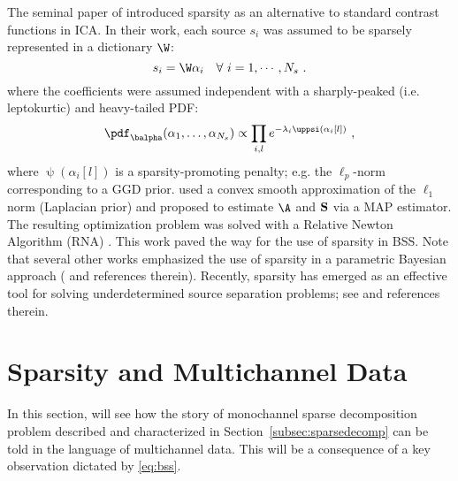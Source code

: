 The seminal paper of \citet{ica:zibu_pearl} introduced sparsity as an alternative to standard contrast functions in ICA. 
In their work, each source $s_i$ was assumed to be sparsely represented in a dictionary $\W$:
\begin{equation}
s_i =  \W \alpha_i \quad \forall ~ i=1,\cdots,N_s ~.
\end{equation}
where the coefficients were assumed independent with a sharply-peaked (i.e. leptokurtic) and heavy-tailed PDF:
\begin{equation}
\pdf_{\balpha}(\alpha_1,\ldots,\alpha_{N_s}) \propto \prod_{i,l} e^{-\lambda_i \uppsi(\alpha_i[l])} ~ ,
\end{equation}
where $\uppsi(\alpha_i[l])$ is a sparsity-promoting penalty; e.g. the $\ell_p$-norm corresponding to a GGD prior. \citet{ica:zibu_pearl} used a convex smooth approximation of the $\ell_1$ norm (Laplacian prior) and proposed to estimate $\A$ and $\bf S$ via a MAP estimator. The resulting optimization problem was solved with a Relative Newton Algorithm (RNA) \citep{ica:zibu_relnewton}. This work paved the way for the use of sparsity in BSS. Note that several other works emphasized the use of sparsity in a parametric Bayesian approach (\citet{Djafa06} and references therein). Recently, sparsity has emerged as an effective tool for solving underdetermined source separation problems; see \citep{ica:cicho06_1,ica:cichocki,ica:zibu_bronst,LNCS46660430} and references therein.
 



\section{Sparsity and Multichannel Data}
\label{sec:bss_sparse}
In this section, will see how the story of monochannel sparse decomposition problem described and characterized in Section~\ref{subsec:sparsedecomp} can be told in the language of multichannel data. This will be a consequence of a key observation dictated by \eqref{eq:bss}.


